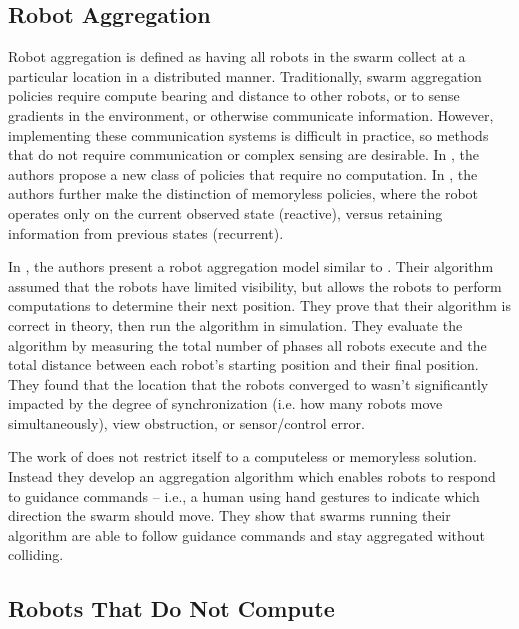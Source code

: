\documentclass[conference]{IEEEtran}
\begin{document}
  \subsection{Robot Aggregation}
    Robot aggregation is defined as having all robots in the swarm collect at a particular location in a distributed manner. Traditionally, swarm aggregation policies require compute bearing and distance to other robots, or to sense gradients in the environment, or otherwise communicate information. However, implementing these communication systems is difficult in practice, so methods that do not require communication or complex sensing are desirable. In \cite{gauci_self-organized_2014}, the authors propose a new class of policies that require no computation. In \cite{gauci_self-organized_2014,gauci_evolving_2014,kernbach_re-embodiment_2009,ando_distributed_1999}, the authors further make the distinction of memoryless policies, where the robot operates only on the current observed state (reactive), versus retaining information from previous states (recurrent).

    In \cite{ando_distributed_1999}, the authors present a robot aggregation model similar to \cite{gauci_self-organized_2014}. Their algorithm assumed that the robots have limited visibility, but allows the robots to perform computations to determine their next position. They prove that their algorithm is correct in theory, then run the algorithm in simulation. They evaluate the algorithm by measuring the total number of phases all robots execute and the total distance between each robot's starting position and their final position. They found that the location that the robots converged to wasn't significantly impacted by the degree of synchronization (i.e. how many robots move simultaneously), view obstruction, or sensor/control error.

    The work of \cite{gasparri_swarm_2012} does not restrict itself to a computeless or memoryless solution. Instead they develop an aggregation algorithm which enables robots to respond to guidance commands -- i.e., a human using hand gestures to indicate which direction the swarm should move. They show that swarms running their algorithm are able to follow guidance commands and stay aggregated without colliding.

  \subsection{Robots That Do Not Compute}
\end{document}
